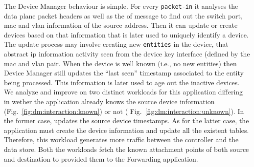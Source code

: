 \begin{figure}[ht]
\TopFloatBoxes
\begin{floatrow}

\end{floatrow}
\end{figure}

The Device Manager behaviour is simple. 
For every \texttt{packet-in} it analyses the data plane packet headers as well as the \gls{of} message to find out the switch port, \gls{mac} and \gls{vlan} information of the source address. 
Then it can update or create devices based on that information that is later used to uniquely identify a device. 
The update process may involve creating new \texttt{entities} in the device, that abstract \gls{ip} information activity seen from the device key interface (defined by the \gls{mac} and \gls{vlan} pair. 
When the device is well known (i.e., no new entities) then Device Manager still updates the ``last seen'' timestamp associated to the entity being processed. This information is later used to age out the inactive devices. 
We analyze and improve on two distinct workloads for this application differing in wether the application already knows the source device information (Fig.~\ref{fig:dm:interaction:known}) or not ( Fig.~\ref{fig:dm:interaction:unknown}). 
In the former case, updates the source device timestamps.  As for the latter case, the application must create the device information and update all the existent tables. Therefore, this workload generates more traffic between the controller and the data store. Both the workloads fetch the known attachment points of both source and destination to provided them  to the Forwarding application. 

